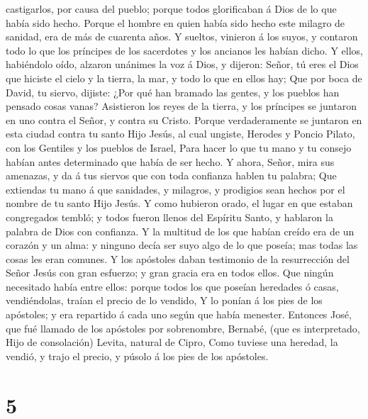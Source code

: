 castigarlos, por causa del pueblo; porque todos glorificaban á Dios de
lo que había sido hecho.  Porque el hombre en quien había
sido hecho este milagro de sanidad, era de más de cuarenta años.
 Y sueltos, vinieron á los suyos, y contaron todo lo que
los príncipes de los sacerdotes y los ancianos les habían dicho.
 Y ellos, habiéndolo oído, alzaron unánimes la voz á Dios,
y dijeron: Señor, tú eres el Dios que hiciste el cielo y la tierra, la
mar, y todo lo que en ellos hay;  Que por boca de David, tu
siervo, dijiste: ¿Por qué han bramado las gentes, y los pueblos han
pensado cosas vanas?  Asistieron los reyes de la tierra, y
los príncipes se juntaron en uno contra el Señor, y contra su Cristo.
 Porque verdaderamente se juntaron en esta ciudad contra tu
santo Hijo Jesús, al cual ungiste, Herodes y Poncio Pilato, con los
Gentiles y los pueblos de Israel,  Para hacer lo que tu
mano y tu consejo habían antes determinado que había de ser hecho.
 Y ahora, Señor, mira sus amenazas, y da á tus siervos que
con toda confianza hablen tu palabra;  Que extiendas tu
mano á que sanidades, y milagros, y prodigios sean hechos por el nombre
de tu santo Hijo Jesús.  Y como hubieron orado, el lugar en
que estaban congregados tembló; y todos fueron llenos del Espíritu
Santo, y hablaron la palabra de Dios con confianza.  Y la
multitud de los que habían creído era de un corazón y un alma: y ninguno
decía ser suyo algo de lo que poseía; mas todas las cosas les eran
comunes.  Y los apóstoles daban testimonio de la
resurrección del Señor Jesús con gran esfuerzo; y gran gracia era en
todos ellos.  Que ningún necesitado había entre ellos:
porque todos los que poseían heredades ó casas, vendiéndolas, traían el
precio de lo vendido,  Y lo ponían á los pies de los
apóstoles; y era repartido á cada uno según que había menester.
 Entonces José, que fué llamado de los apóstoles por
sobrenombre, Bernabé, (que es interpretado, Hijo de consolación) Levita,
natural de Cipro,  Como tuviese una heredad, la vendió, y
trajo el precio, y púsolo á los pies de los apóstoles.

\hypertarget{section-4}{%
\section{5}\label{section-4}}

